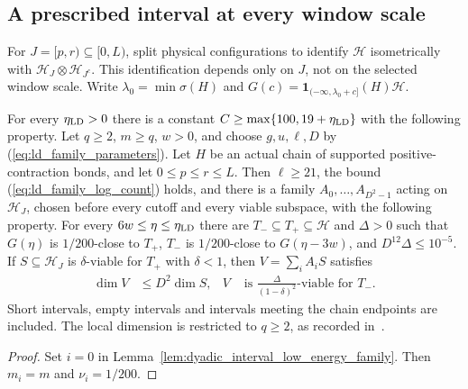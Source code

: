\subsection{A prescribed interval at every window scale}

For $J=[p,r)\subseteq[0,L)$, split physical configurations to identify
$\mathcal H$ isometrically with $\mathcal H_J\otimes\mathcal H_{J^c}$.
This identification depends only on $J$, not on the selected window scale.
Write $\lambda_0=\min\sigma(H)$ and
$G(c)=\mathbf1_{(-\infty,\lambda_0+c]}(H)\mathcal H$.

\begin{theorem}
    \label{thm:interval_low_energy_family}
    \leanok
    For every $\eta_{\rm LD}>0$ there is a constant
    $C\ge\max\{100,19+\eta_{\rm LD}\}$ with the following property.
    Let $q\ge2$, $m\ge q$, $w>0$, and choose $g,u,\ell,D$ by
    (\ref{eq:ld_family_parameters}). Let $H$ be an actual chain of
    supported positive-contraction bonds, and let $0\le p\le r\le L$.
    Then $\ell\ge21$, the bound (\ref{eq:ld_family_log_count}) holds,
    and there is a family $A_0,\ldots,A_{D^2-1}$ acting on $\mathcal H_J$,
    chosen before every cutoff and every viable subspace, with the
    following property. For every $6w\le\eta\le\eta_{\rm LD}$ there are
    $T_-\subseteq T_+\subseteq\mathcal H$ and $\Delta>0$ such that
    $G(\eta)$ is $1/200$-close to $T_+$, $T_-$ is $1/200$-close to
    $G(\eta-3w)$, and $D^{12}\Delta\le10^{-5}$.
    If $S\subseteq\mathcal H_J$ is $\delta$-viable for $T_+$ with
    $\delta<1$, then $V=\sum_i A_iS$ satisfies
    \begin{align}
        \dim V & \le D^2\dim S,                                                &
        V      & \text{ is }\frac{\Delta}{(1-\delta)^2}\text{-viable for }T_-.
        \label{eq:ld_interval_improvement}
    \end{align}
    Short intervals, empty intervals and intervals meeting the chain
    endpoints are included. The local dimension is restricted to
    $q\ge2$, as recorded in~\cite{gap:alvv16_low_energy_family_scope}.
\end{theorem}
\begin{proof}\leanok
    Set $i=0$ in Lemma~\ref{lem:dyadic_interval_low_energy_family}.
    Then $m_i=m$ and $\nu_i=1/200$.
\end{proof}

